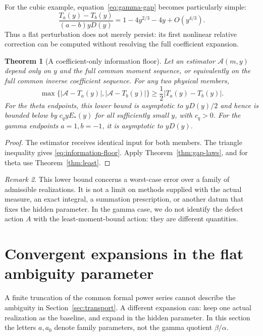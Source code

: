 \documentclass[11pt,a4paper]{article}
\numberwithin{equation}{section}
\newtheorem{theorem}{Theorem}[section]
\theoremstyle{definition}
\theoremstyle{remark}
\newtheorem{remark}[theorem]{Remark}
\begin{document}
For the cubic example, equation~\eqref{eq:gamma-gap} becomes particularly
simple:
\begin{equation}
 \frac{T_a(y)-T_b(y)}{(a-b)yD(y)}
 =1-4y^{2/3}-4y+O(y^{4/3}).
 \label{eq:cubic-gap}
\end{equation}
Thus a flat perturbation does not merely persist: its first nonlinear
relative correction can be computed without resolving the full
coefficient expansion.

\begin{theorem}[A coefficient-only information floor]
\label{thm:floor}
Let an estimator \(\mathcal A(m,y)\) depend only on \(y\) and the full
common moment sequence, or equivalently on the full common inverse
coefficient sequence. For any two physical members,
\begin{equation}
 \max\{|\mathcal A-T_a(y)|,|\mathcal A-T_b(y)|\}
 \ge\frac12|T_a(y)-T_b(y)|.
 \label{eq:information-floor}
\end{equation}
For the theta endpoints, this lower bound is asymptotic to
\(yD(y)/2\) and hence is bounded below by \(c_qyE_*(y)\) for all
sufficiently small \(y\), with \(c_q>0\). For the gamma endpoints
\(a=1,b=-1\), it is asymptotic to \(yD(y)\).
\end{theorem}
\begin{proof}
The estimator receives identical input for both members. The triangle
inequality gives \eqref{eq:information-floor}. Apply
Theorem~\ref{thm:gap-laws}, and for theta use Theorem~\ref{thm:least}.
\end{proof}

\begin{remark}
This lower bound concerns a worst-case error over a family of admissible
realizations. It is not a limit on methods supplied with the actual
measure, an exact integral, a summation prescription, or another datum
that fixes the hidden parameter. In the gamma case, we do not identify
the defect action \(A\) with the least-moment-bound action: they are
different quantities.
\end{remark}

\section{Convergent expansions in the flat ambiguity parameter}
\label{sec:sectors}

A finite truncation of the common formal power series cannot describe
the ambiguity in Section~\ref{sec:transport}. A different expansion can:
keep one actual realization as the baseline, and expand in the hidden
parameter. In this section the letters \(a,a_0\) denote family
parameters, not the gamma quotient \(\beta/\alpha\).
\end{document}
